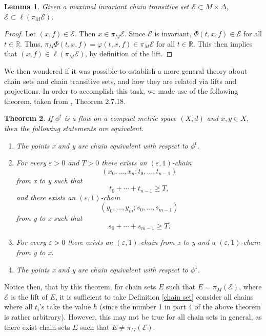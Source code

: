\documentclass[11pt]{article}
\newtheorem{thm}{Theorem}
\newtheorem{lem}[thm]{Lemma}
\begin{document}
\begin{lem}
Given a maximal invariant chain transitive set $\mathcal{E}\subset M\times\Delta$, $\mathcal{E}\subset\ell(\pi_M\mathcal{E})$.
\end{lem}
\begin{proof}
Let $(x,f)\in\mathcal{E}$.  Then $x\in \pi_M\mathcal{E}$.  Since $\mathcal{E}$ is invariant, $\Phi(t,x,f)\in \mathcal{E}$ for all $t\in\mathbb{R}$.  Thus, $\pi_M\Phi(t,x,f)=\varphi(t,x,f)\in\pi_M\mathcal{E}$ for all $t\in\mathbb{R}$.  This then implies that $(x,f)\in\ell(\pi_M\mathcal{E})$, by definition of the lift. 
\end{proof}


We then wondered if it was possible to establish a more general theory about chain sets and chain transitive sets, and how they are related via lifts and projections.  In order to accomplish this task, we made use of the following theorem, taken from \cite{Alongi}, Theorem 2.7.18.


\begin{thm}\label{h flow}
If $\phi^t$ is a flow on a compact metric space $(X,d)$ and $x,y\in X$, then the following statements are equivalent.
\begin{enumerate}
\item The points x and y are chain equivalent with respect to $\phi^t$.
\item For every $\varepsilon>0$ and $T>0$ there exists an $(\varepsilon,1)$-chain
$$(x_0,\ldots,x_n;t_0,\ldots,t_{n-1})$$
from x to y such that 
$$t_0+\cdots+t_{n-1}\geq T,$$
and there exists an $(\varepsilon,1)$-chain 
$$(y_0,\ldots,y_m;s_0,\ldots,s_{m-1})$$
from y to x such that
$$s_0+\cdots+s_{m-1}\geq T.$$
\item For every $\varepsilon>0$ there exists an $(\varepsilon,1)$-chain from x to y and a $(\varepsilon,1)$-chain from y to x.
\item The points x and y are chain equivalent with respect to $\phi^1$.
\end{enumerate}
\end{thm}

Notice then, that by this theorem, for chain sets $E$ such that $E=\pi_M(\mathcal{E})$, where $\mathcal{E}$ is the lift of $E$, it is sufficient to take Definition \ref{chain set} consider all chains where all $t_i$'s take the value $h$ (since the number 1 in part 4 of the above theorem is rather arbitrary).  However, this may not be true for all chain sets in general, as there exist chain sets $E$ such that $E\not=\pi_M(\mathcal{E})$.  
\end{document}
